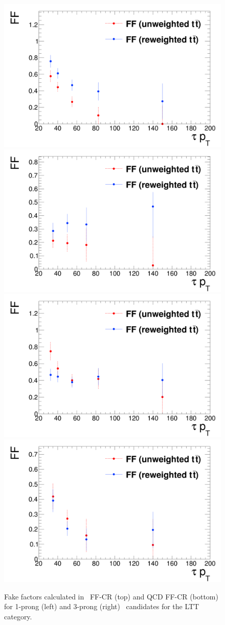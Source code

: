 \begin{figure}[htbp]
\centering
\includegraphics[width=.4\textwidth]{DiHiggs/plots/FF_CRs/LTTttbarCR1p.png}
\includegraphics[width=.4\textwidth]{DiHiggs/plots/FF_CRs/LTTttbarCR3p.png} \\
\includegraphics[width=.4\textwidth]{DiHiggs/plots/FF_CRs/LTTInvCR1p.png}
\includegraphics[width=.4\textwidth]{DiHiggs/plots/FF_CRs/LTTInvCR3p.png}\\
\caption{Fake factors 
calculated in \ttbar\ FF-CR (top) and QCD FF-CR (bottom)
for 1-prong (left) and 3-prong (right) 
\tauhad\ candidates for the LTT category.}
\label{fig:LTT_FF}
\end{figure}

